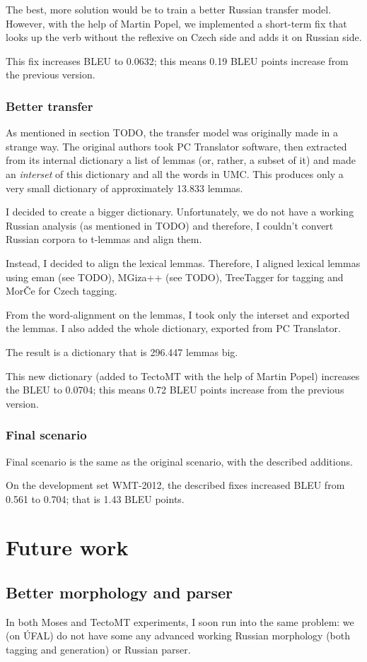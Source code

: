 The best, more  solution would be to train a better Russian transfer model. However, with the help of Martin Popel, we implemented a short-term fix that looks up the verb without the reflexive on Czech side and adds it on Russian side.

This fix increases BLEU to 0.0632; this means 0.19 BLEU points increase from the previous version. 

\subsubsection{Better transfer}
As mentioned in section TODO, the transfer model was originally made in a strange way. 
The original authors took PC Translator software, then extracted from its internal dictionary a list of lemmas (or, rather, a subset of it) and made an \emph{interset} of this dictionary and all the words in UMC. This produces only a very small dictionary of approximately 13.833 lemmas. 

I decided to create a bigger dictionary. Unfortunately, we do not have a working Russian analysis (as mentioned in TODO) and therefore, I couldn't convert Russian corpora to t-lemmas and align them.

Instead, I decided to align  the lexical lemmas. Therefore, I aligned lexical lemmas using eman (see TODO), MGiza++ (see TODO), TreeTagger for tagging and MorČe for Czech tagging.

From the word-alignment on the lemmas, I took only the interset and exported the lemmas. I also added the whole dictionary, exported from PC Translator. 

The result is a dictionary that is 296.447 lemmas big.

This new dictionary (added to TectoMT with the help of Martin Popel) increases the BLEU to 0.0704; this means 0.72 BLEU points increase from the previous version.
\subsubsection{Final scenario}
Final scenario is the same as the original scenario, with the described additions.

On the development set WMT-2012, the described fixes increased BLEU from 0.561 to 0.704; that is 1.43 BLEU points.
\section{Future work}
\subsection{Better morphology and parser}
In both Moses and TectoMT experiments, I soon run into the same problem: we (on ÚFAL) do not have some any advanced working Russian morphology (both tagging and generation) or Russian parser.

